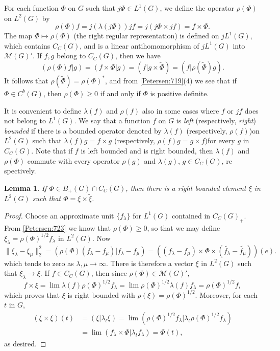 \documentclass{book}
\newtheorem{lemma}[definition]{Lemma}
\begin{document}
For each function \(\Phi\) on \(G\) such that \(j\Phi\in L^1(G)\), we define the operator \(\rho(\Phi)\) on \(L^2(G)\) by
\[
  \rho(\Phi)f=j(\lambda(j\Phi))jf=j(j\Phi\times jf)=f\times\Phi.
\]
The map \(\Phi\mapsto\rho(\Phi)\) (the right regular representation) is defined on \(jL^1(G)\),
which contains \(C_C(G)\), and is a linear antihomomorphism of \(jL^1(G)\) into \(\mathcal{M}(G)'\).
If \(f,g\) belong to \(C_C(G)\), then we have
\[
  (\rho(\Phi)f|g)=(f\times\Phi|g)=(f|g\times\tilde{\Phi})=(f|\rho(\tilde{\Phi})g).
\]
It follows that \(\rho(\tilde{\Phi})=\rho(\Phi)^*\), and from \ref{Petersen:719}(4) we see that if \(\Phi\in C^b(G)\),
then \(\rho(\Phi)\geq0\) if and only if \(\Phi\) is positive definite.\label{Petersen:723}\par
It is convenient to define \(\lambda(f)\) and \(\rho(f)\) also in some cases where \(f\) or \(jf\)
does not belong to \(L^1(G)\). We say that a function \(f\) on \(G\) is \textit{left} (respectively,
\textit{right}) \textit{bounded} if there is a bounded operator denoted by \(\lambda(f)\) (respectively,
\(\rho(f)\))on \(L^2(G)\) such that \(\lambda(f)g = f \times g\) (respectively, \(\rho(f)g= g \times f\))for
every \(g\) in \(C_C(G)\). Note that if \(f\) is left bounded and is right bounded, then
\(\lambda(f)\) and \(\rho(\Phi)\) commute with every operator \(\rho(g)\) and \(\lambda(g)\), \(g \in C_C(G)\), re
spectively.
\begin{lemma}\label{Petersen:724}
  If \(\Phi\in B_+(G)\cap C_C(G)\), then there is a right bounded element \(\xi\) in \(L^2(G)\)
  such that \(\Phi=\xi\times\tilde{\xi}\).
\end{lemma}
\begin{proof}
  Choose an approximate unit \(\{f_\lambda\}\) for \(L^1(G)\) contained in \(C_C(G)_+\). From
  \ref{Petersen:723} we know that \(\rho(\Phi)\geq0\), so that we may define \(\xi_\lambda =\rho(\Phi)^{1/2}f_\lambda\) in \(L^2(G)\).
  Now
  \[
    \|\xi_\lambda-\xi_\mu\|_2^2=(\rho(\Phi)(f_\lambda-f_\mu)|f_\lambda-f_\mu)=
    ((f_\lambda-f_\mu)\times\Phi\times(\tilde{f_\lambda}-\tilde{f_\mu}))(e).
  \]
  which tends to zero as \(\lambda,\mu\rightarrow\infty\). There is therefore a vector \(\xi\)
  in \(L^2(G)\) such that \(\xi_\lambda\rightarrow\xi\). If \(f\in C_C(G)\), then since \(\rho(\Phi)\in\mathcal{M}(G)'\),
  \[  
    f\times\xi=\lim\lambda(f)\rho(\Phi)^{1/2}f_\lambda=\lim\rho(\Phi)^{1/2}\lambda(f)f_\lambda=\rho(\Phi)^{1/2}f,
  \]
  which proves that \(\xi\) is right bounded with \(\rho(\xi)=\rho(\Phi)^{1/2}\).
  Moreover, for each \(t\) in \(G\),
  \begin{align*}
    (\xi\times\xi)(t)&=(\xi|\lambda_t\xi)=\lim(\rho(\Phi)^{1/2}f_\lambda|\lambda_t\rho(\Phi)^{1/2}f_\lambda)\\
    &=\lim(f_\lambda\times\Phi|\lambda_t f_\lambda)=\Phi(t),
  \end{align*}
  as desired.
\end{proof}
\end{document}
